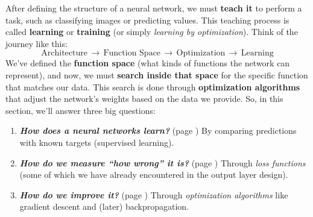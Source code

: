 \highspace
After defining the structure of a neural network, we must \textbf{teach it} to perform a task, such as classifying images or predicting values. This teaching process is called \textbf{learning} or \textbf{training} (or simply \emph{learning by optimization}). Think of the journey like this:
\begin{equation*}
    \text{Architecture} \, \rightarrow \,
    \text{Function Space} \, \rightarrow \,
    \text{Optimization} \, \rightarrow \,
    \text{Learning}
\end{equation*}
We've defined the \textbf{function space} (what kinds of functions the network can represent), and now, we must \textbf{search inside that space} for the specific function that matches our data. This search is done through \textbf{optimization algorithms} that adjust the network's weights based on the data we provide. So, in this section, we'll answer three big questions:
\begin{enumerate}
    \item \emph{\textbf{How does a neural networks learn?}} (page \pageref{sec:supervised-learning-and-training-dataset}) By comparing predictions with known targets (supervised learning).
    \item \emph{\textbf{How do we measure ``how wrong'' it is?}} (page \pageref{sec:error-minimization-and-loss-function}) Through \emph{loss functions} (some of which we have already encountered in the output layer design).
    \item \emph{\textbf{How do we improve it?}} (page \pageref{sec:gradient-descent-basics}) Through \emph{optimization algorithms} like gradient descent and (later) backpropagation.
\end{enumerate}